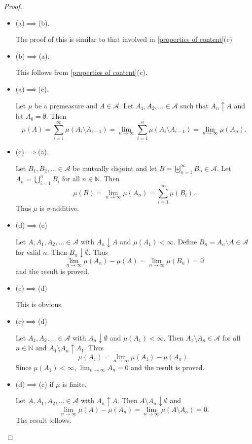 \begin{proof}
~
    \begin{itemize}
        \item (a)$\implies$(b).
        
        The proof of this is similar to that involved in \ref{properties of content}(c)
        
        \item (b)$\implies$(a).
        
        This follows from \ref{properties of content}(c).
        
        \item (a)$\implies$(c).
        
        Let $\mu$ be a premeasure and $A\in\mathcal{A}$. Let $A_1,A_2,\ldots\in\mathcal{A}$ such that $A_n\uparrow A$ and let $A_0=\emptyset$. Then
        $$\mu(A)=\sum_{i=1}^\infty \mu(A_i\setminus A_{i-1})=\lim_{n\to\infty}\sum_{i=1}^n\mu(A_i\setminus A_{i-1})=\lim_{n\to\infty}\mu(A_n).$$
        
        \item (c)$\implies$(a).
        
        Let $B_1,B_2,\ldots\in\mathcal{A}$ be mutually disjoint and let $B=\biguplus_{n=1}^\infty B_n\in\mathcal{A}$. Let $A_n=\bigcup_{i=1}^n B_i$ for all $n\in\mathbb{N}$. Then
        $$\mu(B)=\lim_{n\to\infty}\mu(A_n)=\sum_{i=1}^\infty\mu(B_i).$$
        Thus $\mu$ is $\sigma$-additive.
        
        \item (d)$\implies$(e)
        
        Let $A,A_1,A_2,\ldots\in\mathcal{A}$ with $A_n\downarrow A$ and $\mu(A_1)<\infty$. Define $B_n=A_n\setminus A\in\mathcal{A}$ for valid $n$. Then $B_n\downarrow\emptyset$. Thus
        $$\lim_{n\to\infty}\mu(A_n)-\mu(A)=\lim_{n\to\infty}\mu(B_n)=0$$
        and the result is proved.
        
        \item (e)$\implies$(d)
        
        This is obvious.
        
        \item (c)$\implies$(d)
        
        Let $A_1,A_2,\ldots\in\mathcal{A}$ with $A_n\downarrow\emptyset$ and $\mu(A_1)<\infty$. Then $A_1\setminus A_n\in\mathcal{A}$ for all $n\in\mathbb{N}$ and $A_1\setminus A_n\uparrow A_1$. Thus
        $$\mu(A_1)=\lim_{n\to\infty}\mu(A_1)-\mu(A_n).$$
        Since $\mu(A_1)<\infty$, $\lim_{n\to\infty}A_n=0$ and the result is proved.
        
        \item (d)$\implies$(c) if $\mu$ is finite.
        
        Let $A,A_1,A_2,\ldots\in\mathcal{A}$ with $A_n\uparrow A$. Then $A\setminus A_n\downarrow\emptyset$ and
        $$\lim_{n\to\infty}\mu(A)-\mu(A_n)=\lim_{n\to\infty}\mu(A\setminus A_n)=0.$$
        The result follows.
    \end{itemize}
\end{proof}

